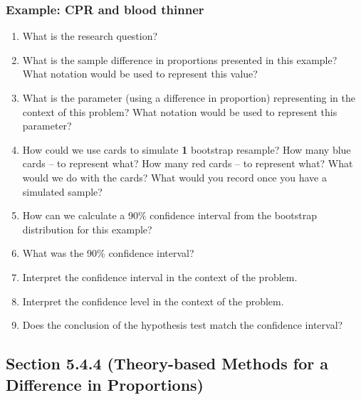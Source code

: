 \documentclass[
]{report}
\newcommand{\rgs}{\vspace{12pt}} %
\begin{document}
\hypertarget{example-cpr-and-blood-thinner-2}{%
\subsubsection*{Example: CPR and blood thinner}\label{example-cpr-and-blood-thinner-2}}

\begin{enumerate}
\def\labelenumi{\arabic{enumi}.}
\item
  What is the research question?
  \rgs
\item
  What is the sample difference in proportions presented in this example? What notation would be used to represent this value?
  \rgs
\item
  What is the parameter (using a difference in proportion) representing in the context of this problem? What notation would be used to represent this parameter?
  \rgs
  \rgs
\item
  How could we use cards to simulate \textbf{1} bootstrap resample? How many blue cards -- to represent what? How many red cards -- to represent what? What would we do with the cards? What would you record once you have a simulated sample?
  \rgs
  \rgs
\item
  How can we calculate a 90\% confidence interval from the bootstrap distribution for this example?
  \rgs
\item
  What was the 90\% confidence interval?
  \rgs
\item
  Interpret the confidence interval in the context of the problem.
  \rgs
  \rgs
\item
  Interpret the confidence level in the context of the problem.
  \rgs
  \rgs
\item
  Does the conclusion of the hypothesis test match the confidence interval?
  \rgs
\end{enumerate}

\hypertarget{section-5.4.4-theory-based-methods-for-a-difference-in-proportions-1}{%
\subsection*{Section 5.4.4 (Theory-based Methods for a Difference in Proportions)}\label{section-5.4.4-theory-based-methods-for-a-difference-in-proportions-1}}

\end{document}
